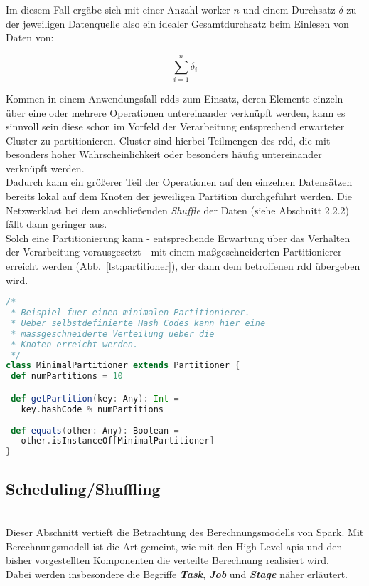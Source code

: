 Im diesem Fall ergäbe sich mit einer Anzahl \gls{worker} $n$ und einem Durchsatz $\delta$ zu der jeweiligen Datenquelle also ein idealer Gesamtdurchsatz beim Einlesen von Daten von:

\begin{equation}
	\sum_{i=1}^{n} \delta_i
\end{equation}

Kommen in einem Anwendungsfall \gls{rdd}s zum Einsatz, deren Elemente einzeln über eine oder mehrere Operationen untereinander verknüpft werden, kann es sinnvoll sein diese schon im Vorfeld der Verarbeitung entsprechend erwarteter Cluster zu partitionieren. Cluster sind hierbei Teilmengen des \gls{rdd}, die mit besonders hoher Wahrscheinlichkeit oder besonders häufig untereinander verknüpft werden.\\

Dadurch kann ein größerer Teil der Operationen auf den einzelnen Datensätzen bereits lokal auf dem Knoten der jeweiligen Partition durchgeführt werden. Die Netzwerklast bei dem anschließenden \textit{Shuffle} der Daten (siehe Abschnitt 2.2.2) fällt dann geringer aus.\\

Solch eine Partitionierung kann - entsprechende Erwartung über das Verhalten der Verarbeitung vorausgesetzt - mit einem maßgeschneiderten Partitionierer erreicht werden (Abb.~\ref{lst:partitioner}), der dann dem betroffenen \gls{rdd} übergeben wird.\\

\begin{lstlisting}[language=Scala,caption={Beispiel: Minimaler Partitionierer},label={lst:partitioner}]
/*
 * Beispiel fuer einen minimalen Partitionierer. 
 * Ueber selbstdefinierte Hash Codes kann hier eine 
 * massgeschneiderte Verteilung ueber die 
 * Knoten erreicht werden.
 */
class MinimalPartitioner extends Partitioner {
 def numPartitions = 10

 def getPartition(key: Any): Int =
   key.hashCode % numPartitions
	
 def equals(other: Any): Boolean =
   other.isInstanceOf[MinimalPartitioner]
}
\end{lstlisting}

\subsection{Scheduling/Shuffling}\\

Dieser Abschnitt vertieft die Betrachtung des Berechnungsmodells von Spark. Mit Berechnungsmodell ist die Art gemeint, wie mit den High-Level \glspl{api} und den bisher vorgestellten Komponenten die verteilte Berechnung realisiert wird.\\
Dabei werden insbesondere die Begriffe \textit{\textbf{Task}}, \textit{\textbf{Job}} und \textit{\textbf{Stage}} näher erläutert.\\

